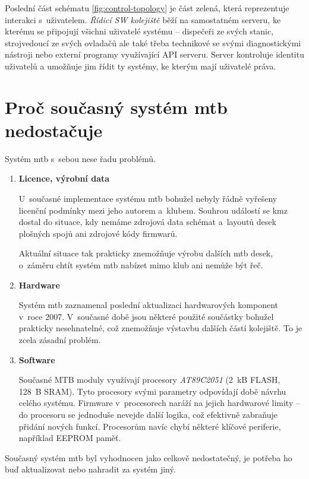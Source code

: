 Poslední část schématu \ref{fig:control-topology} je část zelená, která
reprezentuje interakci s~uživatelem. \textit{Řídicí SW kolejiště} běží na
samostatném serveru, ke kterému se připojují všichni uživatelé systému –
dispečeři ze svých stanic, strojvedoucí ze svých ovladačů ale také třeba
technikové se svými diagnostickými nástroji nebo externí programy využívající
API serveru. Server kontroluje identitu uživatelů a umožňuje jim řídit ty
systémy, ke kterým mají uživatelé práva.

\section{Proč současný systém \gls{mtb} nedostačuje} \label{sec:mtb_fail}

Systém \gls{mtb} s~sebou nese řadu problémů.

\begin{enumerate}
\item \textbf{Licence, výrobní data}

U~současné implementace systému \gls{mtb} bohužel nebyly řádně vyřešeny licenční
podmínky mezi jeho autorem a~klubem. Souhrou událostí se \gls{kmz} dostal do
situace, kdy nemáme zdrojová data schémat a~layoutů desek plošných spojů ani
zdrojové kódy firmwarů.

Aktuální situace tak prakticky znemožňuje výrobu dalších \gls{mtb} desek,
o~záměru chtít systém \gls{mtb} nabízet mimo klub ani nemůže být řeč.

\item \textbf{Hardware}

Systém \gls{mtb} zaznamenal poslední aktualizaci hardwarových komponent v~roce
2007. V~současné době jsou některé použité součástky bohužel prakticky
nesehnatelné, což znemožňuje výstavbu dalších částí kolejiště. To je zcela
zásadní problém.

\item \textbf{Software}

Současné MTB moduly využívají procesory \textit{AT89C2051} (2~kB FLASH,
128~B SRAM). Tyto procesory svými parametry odpovídají době návrhu celého
systému. Firmware v~procesorech naráží na jejich hardwarové limity – do
procesoru se jednoduše nevejde další logika, což efektivně zabraňuje přidání
nových funkcí. Procesorům navíc chybí některé klíčové periferie, například
EEPROM paměť.

\end{enumerate}

Současný systém \gls{mtb} byl vyhodnocen jako celkově nedostatečný, je potřeba
ho buď aktualizovat nebo nahradit za systém jiný.

